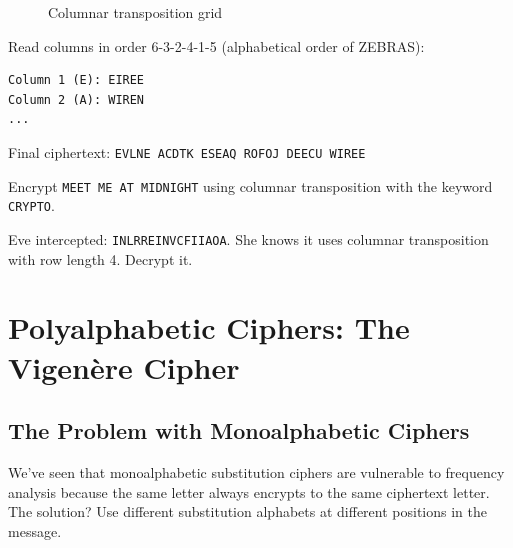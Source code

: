 \documentclass[11pt,a4paper]{report}
\begin{document}
\begin{figure}[h]
\caption{Columnar transposition grid}
\end{figure}

Read columns in order 6-3-2-4-1-5 (alphabetical order of ZEBRAS):
\begin{verbatim}
Column 1 (E): EIREE
Column 2 (A): WIREN
...
\end{verbatim}

Final ciphertext: \verb|EVLNE ACDTK ESEAQ ROFOJ DEECU WIREE|

\begin{ex}
Encrypt \verb|MEET ME AT MIDNIGHT| using columnar transposition with the keyword \verb|CRYPTO|.
\end{ex}

\begin{ex}
Eve intercepted: \verb|INLRREINVCFIIAOA|. She knows it uses columnar transposition with row length 4. Decrypt it.
\end{ex}

\newpage
\section{Polyalphabetic Ciphers: The Vigenère Cipher}

\subsection{The Problem with Monoalphabetic Ciphers}

We've seen that monoalphabetic substitution ciphers are vulnerable to frequency analysis because the same letter always encrypts to the same ciphertext letter. The solution? Use different substitution alphabets at different positions in the message.
\end{document}
